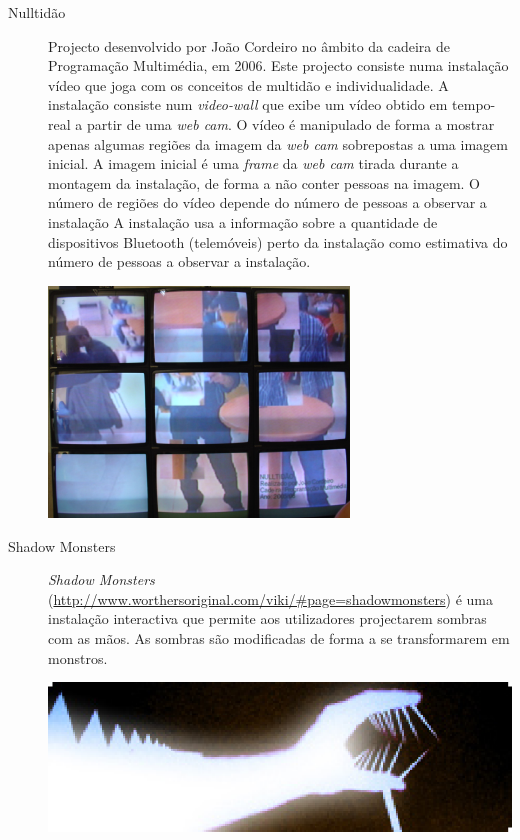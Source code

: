 \begin{description}
\item[Nulltidão] Projecto desenvolvido por João Cordeiro no âmbito da cadeira de Programação Multimédia, em 2006. 
Este projecto consiste numa instalação vídeo que joga com os conceitos de multidão e individualidade. 
A instalação consiste num \emph{video-wall} que exibe um vídeo obtido em tempo-real a partir de uma \emph{web cam}. O vídeo
é manipulado de forma a mostrar apenas algumas regiões da imagem da \emph{web cam} sobrepostas a uma imagem inicial. A imagem inicial é uma \emph{frame} da \emph{web cam} tirada durante a montagem da instalação, de forma a não conter pessoas na imagem. O número de regiões do vídeo depende do número de pessoas a observar a instalação
A instalação usa a informação sobre a quantidade de dispositivos Bluetooth (telemóveis) perto da instalação como estimativa do número de pessoas a observar a instalação. 
\begin{center}
	\includegraphics[width=8cm]{images//nulltidao}
\end{center}

\item[Shadow Monsters] \emph{Shadow Monsters} (\url{http://www.worthersoriginal.com/viki/#page=shadowmonsters}) é uma instalação interactiva que permite aos utilizadores projectarem sombras com as mãos. As sombras são modificadas de forma a se transformarem em monstros. 
\begin{center}
	\includegraphics{images/shadowmonsters.eps}
\end{center}


\end{description}
